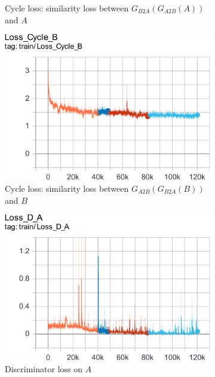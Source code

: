 \documentclass[10pt,twocolumn,letterpaper]{article}
\begin{document}
\begin{figure}[h]
\begin{subfigure}{.24\linewidth}
      \caption{Cycle loss: similarity loss between $G_{B2A}(G_{A2B}(A))$ and
      $A$}
   \end{subfigure}
   \begin{subfigure}{.24\linewidth}
      \centering
      \includegraphics[width=\linewidth]{cyclegan-loss_cycle_b}
      \caption{Cycle loss: similarity loss between $G_{A2B}(G_{B2A}(B))$ and
      $B$}
   \end{subfigure}
   \begin{subfigure}{.24\linewidth}
      \centering
      \includegraphics[width=\linewidth]{cyclegan-loss_d_a}
      \caption{Discriminator loss on $A$}
   \end{subfigure}
   \begin{subfigure}{.24\linewidth}
      \centering

\end{subfigure}
\end{figure}
\end{document}
